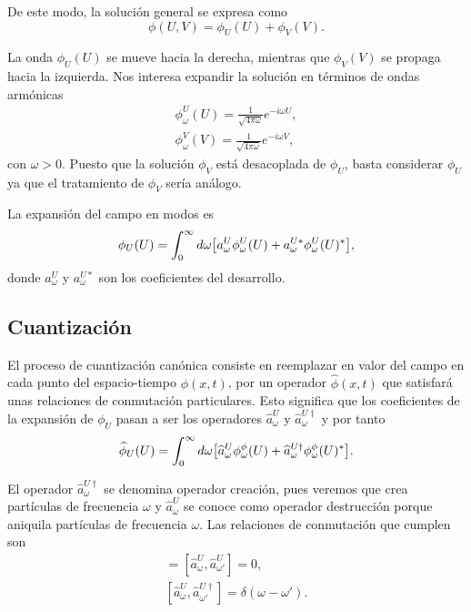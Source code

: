De este modo, la solución general se expresa como
\begin{equation}
  \phi(U,V)=\phi_U(U)+\phi_V(V).
\end{equation}

La onda $\phi_U(U)$ se mueve hacia la derecha, mientras que $\phi_V(V)$ se propaga hacia la izquierda.
Nos interesa expandir la solución en términos de ondas armónicas
\begin{gather}
  \phi_\omega^U(U)=\frac{1}{\sqrt{4\pi\omega}} e^{-i\omega U},  \\
  \phi_\omega^V(V)=\frac{1}{\sqrt{4\pi\omega}} e^{-i\omega V},
\end{gather}
con $\omega>0$. Puesto que la solución $\phi_V$ está desacoplada de $\phi_U$, basta considerar $\phi_U$ ya que
el tratamiento de $\phi_V$ sería análogo.

La expansión del campo en modos es
\begin{equation}
\phi_U(U) = \int_0^\infty d\omega \qty[a_\omega^U \phi_\omega^U (U)+a_\omega^{U*} \phi_\omega^U (U)^*],
\end{equation}
donde $a_\omega^U$ y $a_\omega^{U*}$ son los coeficientes del desarrollo.

\subsection{Cuantización}

El proceso de cuantización canónica consiste en reemplazar en valor del campo en cada
punto del espacio-tiempo $\phi(x,t)$, por un operador $\widehat \phi(x,t)$ que satisfará unas
relaciones de conmutación particulares. 
Esto significa que los coeficientes de la expansión de $\phi_U$ pasan a ser los operadores
$\widehat a_\omega^U$ y $\widehat a_\omega^{U\dagger}$ y por tanto
\begin{equation}
  \widehat \phi_U(U) = \int_0^\infty d\omega \qty[\widehat a_\omega^U\phi_\omega^\phi (U)+\widehat a_\omega^{U\dagger} \phi_\omega^\phi (U)^*].
\end{equation}

El operador $\widehat a_\omega^{U\dagger}$ se denomina operador creación, pues veremos que crea 
partículas de frecuencia $\omega$ y $\widehat a_\omega^U$ se conoce como operador destrucción porque
aniquila partículas de frecuencia $\omega$.
Las relaciones de conmutación que cumplen son
\begin{gather}
  [\widehat a_\omega^{U\dagger},\widehat a_{\omega'}^{U\dagger}]=[\widehat a_\omega^U,\widehat a_{\omega'}^U]=0, \\
  [\widehat a_\omega^U,\widehat a_{\omega'}^{U\dagger}]=\delta(\omega-\omega').
\end{gather}

